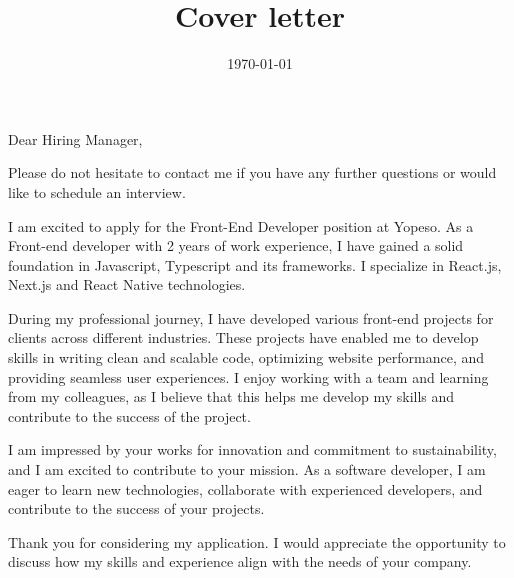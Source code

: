 \documentclass[11pt,a4paper,roman]{moderncv}        %
\title{Cover letter}
\begin{document}
\date{\today}
\opening{Dear Hiring Manager,}
\closing{Please do not hesitate to contact me if you have any further questions or would like to schedule an interview.
}
\makelettertitle

I am excited to apply for the Front-End Developer position at Yopeso. As a Front-end developer with 2 years of work experience, I have gained a solid foundation in Javascript, Typescript and its frameworks. I specialize in React.js, Next.js and React Native technologies.

During my professional journey, I have developed various front-end projects for clients across different industries. These projects have enabled me to develop skills in writing clean and scalable code, optimizing website performance, and providing seamless user experiences. I enjoy working with a team and learning from my colleagues, as I believe that this helps me develop my skills and contribute to the success of the project.

I am impressed by your works for innovation and commitment to sustainability, and I am excited to contribute to your mission. As a software developer, I am eager to learn new technologies, collaborate with experienced developers, and contribute to the success of your projects.

Thank you for considering my application. I would appreciate the opportunity to discuss how my skills and experience align with the needs of your company.



\vspace{0.5cm}


\makeletterclosing
\end{document}
